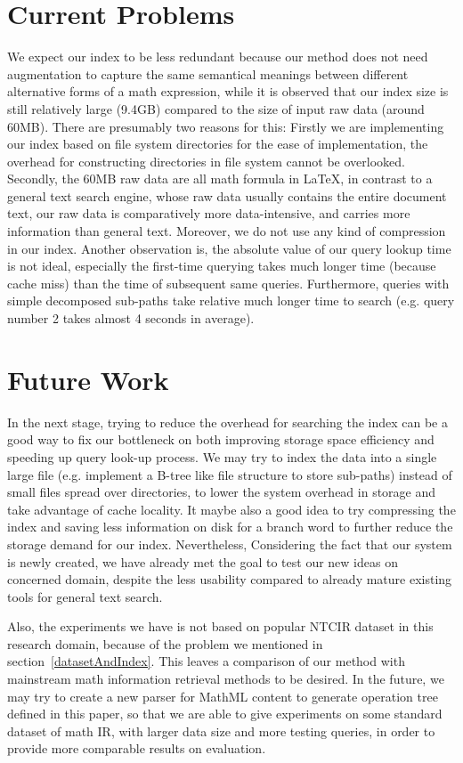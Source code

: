 \section{Current Problems}
We expect our index to be less redundant because our method does not need augmentation to capture the same semantical meanings between different alternative forms of a math expression,
while it is observed that our index size is still relatively large (9.4GB) compared to the size of input raw data (around 60MB).
There are presumably two reasons for this: 
Firstly we are implementing our index based on file system directories for the ease of implementation, the overhead for constructing directories in file system cannot be overlooked. 
Secondly, the 60MB raw data are all math formula in \LaTeX,	in contrast to a general text search engine, whose raw data usually contains the entire document text, our raw data is comparatively more data-intensive, and carries more information than general text. 
Moreover, we do not use any kind of compression in our index.
Another observation is, the absolute value of our query lookup time is not ideal, especially
the first-time querying takes much longer time (because cache miss) than the time of subsequent same queries. 
Furthermore, queries with simple decomposed sub-paths take relative much longer time to search (e.g. query number 2 takes almost 4 seconds in average). 

\section{Future Work}
In the next stage, trying to reduce the overhead for searching the index can be a good way to fix our bottleneck on both improving storage space efficiency and speeding up query look-up process. 
We may try to index the data into a single large file (e.g. implement a B-tree like file structure to store sub-paths) instead of small files spread over directories, to lower the system overhead in storage and take advantage of cache locality. 
It maybe also a good idea to try compressing the index and saving less information on disk for a branch word to further reduce the storage demand for our index.
Nevertheless, Considering the fact that our system is newly created, we have already met the goal to test our new ideas on concerned domain, despite the less usability compared to already mature existing tools for general text search.

Also, the experiments we have is not based on popular NTCIR dataset in this research domain, because of the problem we mentioned in section~\ref{datasetAndIndex}. 
This leaves a comparison of our method with mainstream math information retrieval methods to be desired.  
In the future, we may try to create a new parser for MathML content to generate operation tree defined in this paper, so that we are able to give experiments on some standard dataset of math IR, with larger data size and more testing queries, in order to provide more comparable results on evaluation.

